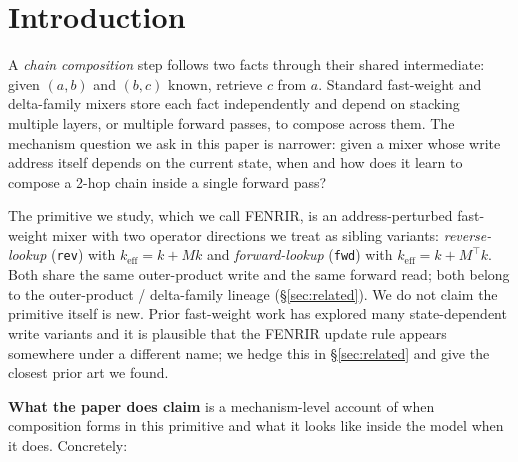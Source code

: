 \documentclass[11pt]{article}
\begin{document}
\section{Introduction}
\label{sec:intro}

A \emph{chain composition} step follows two facts through their shared
intermediate: given $(a, b)$ and $(b, c)$ known, retrieve $c$ from $a$.
Standard fast-weight and delta-family mixers store each fact
independently and depend on stacking multiple layers, or multiple
forward passes, to compose across them. The mechanism question we ask
in this paper is narrower: given a mixer whose write address itself
depends on the current state, when and how does it learn to compose a
2-hop chain inside a single forward pass?

The primitive we study, which we call FENRIR, is an address-perturbed
fast-weight mixer with two operator directions we treat as sibling
variants: \emph{reverse-lookup} (\texttt{rev}) with
$k_{\text{eff}} = k + M k$ and \emph{forward-lookup} (\texttt{fwd})
with $k_{\text{eff}} = k + M^{\top} k$. Both share the same
outer-product write and the same forward read; both belong to the
outer-product / delta-family lineage (\S\ref{sec:related}). We do not
claim the primitive itself is new. Prior fast-weight work has explored
many state-dependent write variants and it is plausible that the
FENRIR update rule appears somewhere under a different name; we hedge
this in \S\ref{sec:related} and give the closest prior art we found.

\textbf{What the paper does claim} is a mechanism-level account of when
composition forms in this primitive and what it looks like inside the
model when it does. Concretely:
\end{document}
